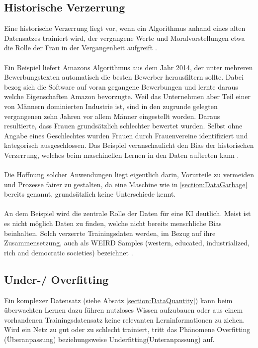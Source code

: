 \documentclass[12pt,oneside,a4paper,parskip]{scrbook}
\begin{document}
\subsection{Historische Verzerrung}
\label{section:biasInTest}
Eine historische Verzerrung liegt vor, wenn ein Algorithmus anhand eines alten Datensatzes trainiert wird, der vergangene Werte und Moralvorstellungen etwa die Rolle der Frau in der Vergangenheit aufgreift \cite{kipedia}.
\\\\
Ein Beispiel liefert Amazons Algorithmus aus dem Jahr 2014, der unter mehreren Bewerbungstexten automatisch die besten Bewerber herausfiltern sollte. Dabei bezog sich die Software auf voran gegangene Bewerbungen und lernte daraus welche Eigenschaften Amazon bevorzugte. Weil das Unternehmen aber Teil einer von Männern dominierten Industrie ist, sind in den zugrunde gelegten vergangenen zehn Jahren vor allem Männer eingestellt worden. Daraus resultierte, dass Frauen grundsätzlich schlechter bewertet wurden. Selbst ohne Angabe eines Geschlechtes wurden Frauen durch Frauenvereine identifiziert und kategorisch ausgeschlossen. Das Beispiel veranschaulicht den Bias der historischen Verzerrung, welches beim maschinellen Lernen in den Daten auftreten kann \cite{amazon}.
\\\\
Die Hoffnung solcher Anwendungen liegt eigentlich darin, Vorurteile zu vermeiden und Prozesse fairer zu gestalten, da eine Maschine wie in \ref{section:DataGarbage} bereits genannt, grundsätzlich keine Unterschiede kennt.
\\\\
An dem Beispiel wird die zentrale Rolle der Daten für eine KI deutlich.
Meist ist es nicht möglich Daten zu finden, welche nicht bereits menschliche Bias beinhalten. Solch verzerrte Trainingsdaten werden, im Bezug auf ihre Zusammensetzung, auch als WEIRD Samples (western, educated, industrialized, rich and democratic societies) bezeichnet \cite{BiasInKi}.

\subsection{Under-/ Overfitting}
\label{section:OverUnderfitting}

Ein komplexer Datensatz (siehe Absatz \ref{section:DataQuantity}) kann beim überwachten Lernen dazu führen nutzloses Wissen aufzubauen oder aus einem vorhandenen Trainingsdatensatz keine relevanten Lerninformationen zu ziehen.
Wird ein Netz zu gut oder zu schlecht trainiert, tritt das Phänomene Overfitting (Überanpassung) beziehungsweise Underfitting(Unteranpassung) auf.
\end{document}

